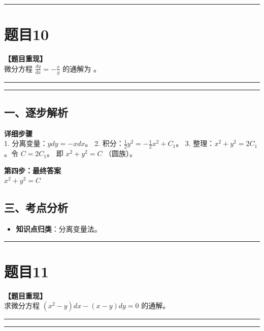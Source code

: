 \documentclass[12pt, a4paper]{ctexart}
\newcommand{\TopSeparator}{
    \par\noindent\rule{\textwidth}{1.5pt}\vspace{0.5em} %
}
\newcommand{\AnalysisSeparator}{
    \par\noindent\rule{\textwidth}{0.5pt}\vspace{0.2em}\hrule\vspace{0.5em} %
}
\newenvironment{RedAnalysis}{
    \par
    \color{red} %
}{
    \par
    \color{black} %
}
\begin{document}
\vspace{2em}

\TopSeparator
\section*{题目10}

\textbf{【题目重现】} \\
微分方程 $ \frac{dy}{dx} = -\frac{x}{y} $ 的通解为 \underline{\hspace{2cm}}。

\AnalysisSeparator

\begin{RedAnalysis}

\subsection*{一、逐步解析}

\textbf{详细步骤} \\
1. 分离变量：$y dy = -x dx$。
2. 积分：$\frac{1}{2}y^2 = -\frac{1}{2}x^2 + C_1$。
3. 整理：$x^2 + y^2 = 2C_1$。令 $C = 2C_1$。
   即 $x^2 + y^2 = C$ （圆族）。

\textbf{第四步：最终答案} \\
$ x^2 + y^2 = C $

\subsection*{三、考点分析}
\begin{itemize}
    \item \textbf{知识点归类}：分离变量法。
\end{itemize}

\end{RedAnalysis}

\vspace{2em}

\TopSeparator
\section*{题目11}

\textbf{【题目重现】} \\
求微分方程 $ (x^{2}-y)dx-(x-y)dy=0 $ 的通解。

\AnalysisSeparator
\end{document}
